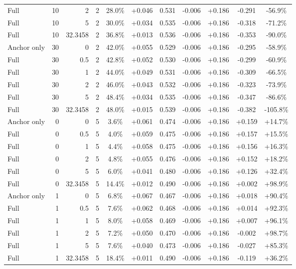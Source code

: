 \begin{table}[htbp]
\begin{tabular}{lrrrccccccc}
Full & 10 & 2 & 2 & 28.0\% & +0.046 & 0.531 & -0.006 & +0.186 & -0.291 & -56.9\% \\
Full & 10 & 5 & 2 & 30.0\% & +0.034 & 0.535 & -0.006 & +0.186 & -0.318 & -71.2\% \\
Full & 10 & 32.3458 & 2 & 36.8\% & +0.013 & 0.536 & -0.006 & +0.186 & -0.353 & -90.0\% \\
Anchor only & 30 & 0 & 2 & 42.0\% & +0.055 & 0.529 & -0.006 & +0.186 & -0.295 & -58.9\% \\
Full & 30 & 0.5 & 2 & 42.8\% & +0.052 & 0.530 & -0.006 & +0.186 & -0.299 & -60.9\% \\
Full & 30 & 1 & 2 & 44.0\% & +0.049 & 0.531 & -0.006 & +0.186 & -0.309 & -66.5\% \\
Full & 30 & 2 & 2 & 46.0\% & +0.043 & 0.532 & -0.006 & +0.186 & -0.323 & -73.9\% \\
Full & 30 & 5 & 2 & 48.4\% & +0.034 & 0.535 & -0.006 & +0.186 & -0.347 & -86.6\% \\
Full & 30 & 32.3458 & 2 & 48.0\% & +0.015 & 0.539 & -0.006 & +0.186 & -0.382 & -105.8\% \\
Anchor only & 0 & 0 & 5 & 3.6\% & +0.061 & 0.474 & -0.006 & +0.186 & +0.159 & +14.7\% \\
Full & 0 & 0.5 & 5 & 4.0\% & +0.059 & 0.475 & -0.006 & +0.186 & +0.157 & +15.5\% \\
Full & 0 & 1 & 5 & 4.4\% & +0.058 & 0.475 & -0.006 & +0.186 & +0.156 & +16.3\% \\
Full & 0 & 2 & 5 & 4.8\% & +0.055 & 0.476 & -0.006 & +0.186 & +0.152 & +18.2\% \\
Full & 0 & 5 & 5 & 6.0\% & +0.041 & 0.480 & -0.006 & +0.186 & +0.126 & +32.4\% \\
Full & 0 & 32.3458 & 5 & 14.4\% & +0.012 & 0.490 & -0.006 & +0.186 & +0.002 & +98.9\% \\
Anchor only & 1 & 0 & 5 & 6.8\% & +0.067 & 0.467 & -0.006 & +0.186 & +0.018 & +90.4\% \\
Full & 1 & 0.5 & 5 & 7.6\% & +0.062 & 0.468 & -0.006 & +0.186 & +0.014 & +92.3\% \\
Full & 1 & 1 & 5 & 8.0\% & +0.058 & 0.469 & -0.006 & +0.186 & +0.007 & +96.1\% \\
Full & 1 & 2 & 5 & 7.2\% & +0.050 & 0.470 & -0.006 & +0.186 & -0.002 & +98.7\% \\
Full & 1 & 5 & 5 & 7.6\% & +0.040 & 0.473 & -0.006 & +0.186 & -0.027 & +85.3\% \\
Full & 1 & 32.3458 & 5 & 18.4\% & +0.011 & 0.490 & -0.006 & +0.186 & -0.119 & +36.2\% \\

\end{tabular}
\end{table}
